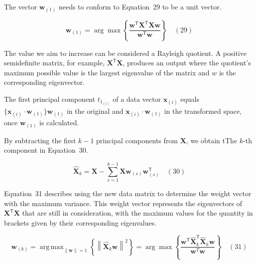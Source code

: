 \documentclass[preprint,12pt]{elsarticle}
\begin{document}
The vector $\mathbf{w}_{\left(1\right)}$ needs to conform to Equation~29 to be a unit vector.

\begin{equation}
	\mathbf{w}_{\left(1\right)}=\arg \max \left\{{\frac{\mathbf{w}^{\mathsf{T}}\mathbf{X}^{\mathsf{T}}\mathbf{Xw}}{\mathbf{w}^{\mathsf{T}}\mathbf{w}}}\right\}
	\quad\left(29\right)
\end{equation}

The value we aim to increase can be considered a Rayleigh quotient. A positive semidefinite matrix, for example, $\mathbf{X}^{\mathsf{T}}\mathbf{X}$, produces an output where the quotient's maximum possible value is the largest eigenvalue of the matrix and $w$ is the corresponding eigenvector.

The first principal component  $t_{1_{\left(i\right)}}$ of a data vector $\mathbf{x}_{\left(i\right)}$ equals $\{\mathbf{x}_{\left(i\right)} \cdot \mathbf{w}_{\left(1\right)}\} \mathbf{w}_{\left(1\right)}$  in the original and $\mathbf{x}_{\left(i\right)} \cdot \mathbf{w}_{\left(1\right)}$ in the transformed space, once $\mathbf{w}_{\left(1\right)}$ is calculated.

By subtracting the first $k - 1$ principal components from $\mathbf{X}$, we obtain tThe $k$-th component in Equation~30.

\begin{equation}
	\mathbf{\hat{X}}_{k}=\mathbf{X} -\sum_{s=1}^{k-1}\mathbf{X} \mathbf{w}_{\left(s\right)}\mathbf{w}_{\left(s\right)}^{\mathsf{T}}
	\quad\left(30\right)
\end{equation}

Equation~31 describes using the new data matrix to determine the weight vector with the maximum variance. This weight vector represents the eigenvectors of $\mathbf{X}^{\mathsf{T}}\mathbf{X}$ that are still in consideration, with the maximum values for the quantity in brackets given by their corresponding eigenvalues. 

\begin{equation}
	\mathbf{w}_{\left(k\right)}=\mathop{\operatorname{arg\,max}}_{\left\|\mathbf{w} \right\|=1}\left\{\left\|\mathbf{\hat{X}}_{k}\mathbf{w} \right\|^{2}\right\}=\arg \max \left\{{\frac{\mathbf{w}^{\mathsf{T}}\mathbf{\hat{X}}_{k}^{\mathsf{T}}\mathbf{\hat{X}}_{k}\mathbf{w}}{\mathbf{w}^{T}\mathbf{w}}}\right\}
	\quad\left(31\right)
\end{equation}
\end{document}
